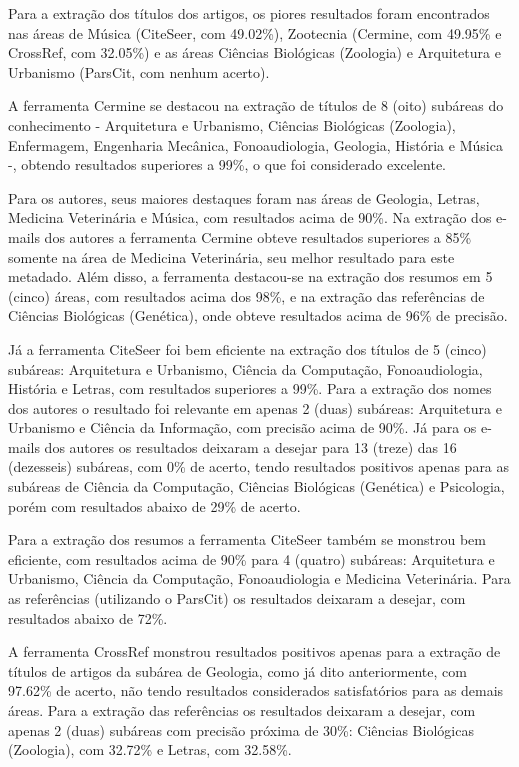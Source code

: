 Para a extração dos títulos dos artigos, os piores resultados foram encontrados nas áreas de Música (CiteSeer, com 49.02\%), Zootecnia (Cermine, com 49.95\% e CrossRef, com 32.05\%) e as áreas Ciências Biológicas (Zoologia) e Arquitetura e Urbanismo (ParsCit, com nenhum acerto).

A ferramenta Cermine se destacou na extração de títulos de 8 (oito) subáreas do conhecimento - Arquitetura e Urbanismo, Ciências Biológicas (Zoologia), Enfermagem, Engenharia Mecânica, Fonoaudiologia, Geologia, História e Música -, obtendo resultados superiores a 99\%, o que foi considerado excelente. 

Para os autores, seus maiores destaques foram nas áreas de Geologia, Letras, Medicina Veterinária e Música, com resultados acima de 90\%. 
Na extração dos e-mails dos autores a ferramenta Cermine obteve resultados superiores a 85\% somente na área de Medicina Veterinária, seu melhor resultado para este metadado. 
Além disso, a ferramenta destacou-se na extração dos resumos em 5 (cinco) áreas, com resultados acima dos 98\%, e na extração das referências de Ciências Biológicas (Genética), onde obteve resultados acima de 96\% de precisão.

Já a ferramenta CiteSeer foi bem eficiente na extração dos títulos de 5 (cinco) subáreas: Arquitetura e Urbanismo, Ciência da Computação, Fonoaudiologia, História e Letras, com resultados superiores a 99\%. 
Para a extração dos nomes dos autores o resultado foi relevante em apenas 2 (duas) subáreas: Arquitetura e Urbanismo e Ciência da Informação, com precisão acima de 90\%. 
Já para os e-mails dos autores os resultados deixaram a desejar para 13 (treze) das 16 (dezesseis) subáreas, com 0\% de acerto, tendo resultados positivos apenas para as subáreas de Ciência da Computação, Ciências Biológicas (Genética) e Psicologia, porém com resultados abaixo de 29\% de acerto.

Para a extração dos resumos a ferramenta CiteSeer também se monstrou bem eficiente, com resultados acima de 90\% para 4 (quatro) subáreas: Arquitetura e Urbanismo, Ciência da Computação, Fonoaudiologia e Medicina Veterinária. 
Para as referências (utilizando o ParsCit) os resultados deixaram a desejar, com resultados abaixo de 72\%.

A ferramenta CrossRef monstrou resultados positivos apenas para a extração de títulos de artigos da subárea de Geologia, como já dito anteriormente, com 97.62\% de acerto, não tendo resultados considerados satisfatórios para as demais áreas. 
Para a extração das referências os resultados deixaram a desejar, com apenas 2 (duas) subáreas com precisão próxima de 30\%: Ciências Biológicas (Zoologia), com 32.72\% e Letras, com 32.58\%.

